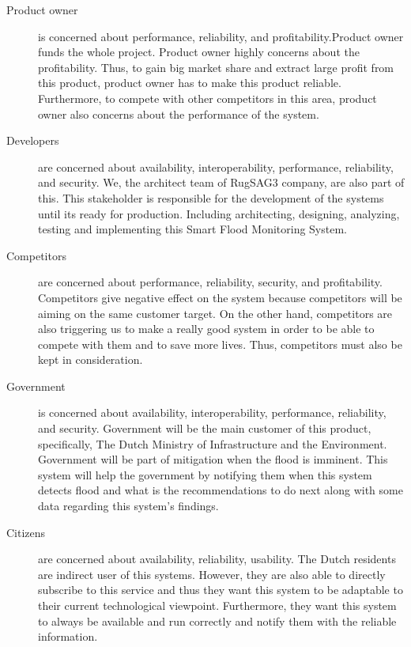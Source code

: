 
\begin{description}
\item[Product owner] is concerned about performance, reliability, and profitability.Product owner funds the whole project. Product owner highly concerns about the profitability. Thus, to gain big market share and extract large profit from this product, product owner has to make this product reliable. Furthermore, to compete with other competitors in this area, product owner also concerns about the performance of the system.
\item[Developers] are concerned about availability, interoperability, performance, reliability, and security. We, the architect team of RugSAG3 company, are also part of this. This stakeholder is responsible for the development of the systems until its ready for production. Including architecting, designing, analyzing, testing and implementing this Smart Flood Monitoring System.
\item[Competitors] are concerned about performance, reliability, security, and profitability. Competitors give negative effect on the system because competitors will be aiming on the same customer target. On the other hand, competitors are also triggering us to make a really good system in order to be able to compete with them and to save more lives. Thus, competitors must also be kept in consideration.
\item[Government] is concerned about availability, interoperability, performance, reliability, and security. Government will be the main customer of this product, specifically, The Dutch Ministry of Infrastructure and the Environment. Government will be part of mitigation when the flood is imminent. This system will help the government by notifying them when this system detects flood and what is the recommendations to do next along with some data regarding this system's findings.
\item[Citizens] are concerned about availability, reliability, usability. The Dutch residents are indirect user of this systems. However, they are also able to directly subscribe to this service and thus they want this system to be adaptable to their current technological viewpoint. Furthermore, they want this system to always be available and run correctly and notify them with the reliable information.

\end{description}
